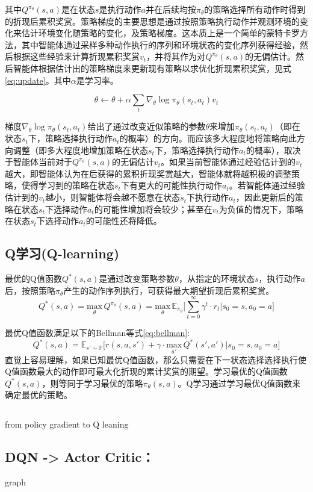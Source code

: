 其中$Q^{\pi_\theta}(s,a)$是在状态$s$是执行动作$a$并在后续均按$\pi_\theta$的策略选择所有动作时得到的折现后累积奖赏。策略梯度的主要思想是通过按照策略执行动作并观测环境的变化来估计环境变化随策略的变化，及策略梯度。这本质上是一个简单的蒙特卡罗方法\cite{hastings1970monte}，其中智能体通过采样多种动作执行的序列和环境状态的变化序列获得经验，然后根据这些经验来计算折现累积奖赏$v_t$，并将其作为对$Q^{\pi_\theta}(s,a)$的无偏估计。然后智能体根据估计出的策略梯度来更新现有策略以求优化折现累积奖赏\cite{sutton2000policy}，见式\ref{eq:update}。其中$\alpha$是学习率。

\begin{equation}
  \label{eq:update}
  \theta \leftarrow \theta + \alpha\sum_{t}{}\nabla_{\theta}\operatorname{log}\pi_{\theta}(s_t, a_t)v_t
\end{equation}

梯度$\nabla_{\theta}\operatorname{log}\pi_{\theta}(s_t, a_t)$给出了通过改变近似策略的参数$\theta$来增加$\pi_{\theta}(s_t, a_t)$（即在状态$s_t$下，策略选择执行动作$a_t$的概率）的方向。而应该多大程度地将策略向此方向调整（即多大程度地增加策略在状态$s_t$下，策略选择执行动作$a_t$的概率），取决于智能体当前对于$Q^{\pi_\theta}(s,a)$的无偏估计$v_t$。如果当前智能体通过经验估计到的$v_t$越大，即智能体认为在后获得的累积折现奖赏越大，智能体就将越积极的调整策略，使得学习到的策略在状态$s_t$下有更大的可能性执行动作$a_t$。若智能体通过经验估计到的$v_t$越小，则智能体将会越不愿意在状态$s_t$下执行动作$a_t$，因此更新后的策略在状态$s_t$下选择动作$a_t$的可能性增加将会较少；甚至在$v_t$为负值的情况下，策略在状态$s_t$下选择动作$a_t$的可能性还将降低。

\subsection{Q学习(Q-learning)}
最优的Q值函数$Q^*(s,a)$是通过改变策略参数$\theta$，从指定的环境状态$s$，执行动作$a$后，按照策略$\pi_\theta$产生的动作序列执行，可获得最大期望折现后累积奖赏。
\begin{equation}
  \label{eq:q_opt}
    Q^*(s, a) = \underset{\theta}{\mathrm{max}}\,Q^{\pi_\theta}(s,a)=\underset{\theta}{\mathrm{max}}\,\mathbb{E}_{\pi_\theta}\bigg[\sum_{t=0}^{\infty} {\gamma^{t}} \cdot r_{t}|s_0=s, a_0=a\bigg]
\end{equation}


最优Q值函数满足以下的Bellman等式\ref{eq:bellman}:
\begin{equation}
  \label{eq:bellman}
    Q^*(s, a) = \mathbb{E}_{s' \sim \mathbb{P}}\big[r(s,a,s') + \gamma\cdot \underset{a'}{\mathrm{max}}\,Q^*(s',a') |s_0=s, a_0=a\big]
\end{equation}
直觉上容易理解，如果已知最优Q值函数，那么只需要在下一状态选择选择执行使Q值函数最大的动作即可最大化折现的累计奖赏的期望。学习最优的Q值函数$Q^*(s,a)$，则等同于学习最优的策略$\pi_\theta(s,a)$。Q学习通过学习最优Q值函数来确定最优的策略。

\subsection{}
from policy gradient to Q leaning




\subsection{DQN -> Actor Critic：}
graph